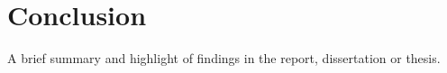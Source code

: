 \chapter{Conclusion}
A brief summary and highlight of findings in the report, dissertation or thesis. 